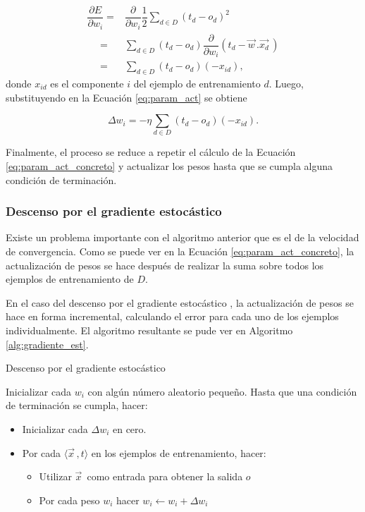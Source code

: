 \documentclass[spanish]{report}
\begin{document}
\begin{equation}
  \begin{array}{ll}
\dfrac{\partial E}{\partial w_i} = & \dfrac{\partial}{\partial w_i} \dfrac{1}{2}\sum_{d \in D}{}{(t_d - o_d)^2} \\
~~~~~~= & \sum_{d \in D}{}{(t_d - o_d)}\dfrac{\partial}{\partial w_i}(t_d - \vec{w}^{\,}.\vec{x_d}^{\,})	 \\
~~~~~~= & \sum_{d \in D}{}{(t_d - o_d)}(-x_{id}),
  \end{array}
\end{equation}
\newline
\noindent donde $x_{id}$ es el componente $i$ del ejemplo de entrenamiento $d$. Luego, substituyendo en la Ecuación \ref{eq:param_act} se obtiene

\begin{equation}\label{eq:param_act_concreto}
\Delta w_i = - \eta \sum_{d \in D}{}{(t_d - o_d)}(-x_{id}).
\end{equation}

Finalmente, el proceso se reduce a repetir el cálculo de la Ecuación \ref{eq:param_act_concreto} y actualizar los pesos hasta que se cumpla alguna condición de terminación. 

\subsubsection{Descenso por el gradiente estocástico}

Existe un problema importante con el algoritmo anterior que es el de la velocidad de convergencia. Como se puede ver en la Ecuación \ref{eq:param_act_concreto}, la actualización de pesos se hace después de realizar la suma sobre todos los ejemplos de entrenamiento de $D$.

En el caso del descenso por el gradiente estocástico \cite{Mitchell97a}, la actualización de pesos se hace en forma incremental, calculando el error para cada uno de los ejemplos individualmente. El algoritmo resultante se pude ver en Algoritmo \ref{alg:gradiente_est}.

\begin{algorithm}
\caption{Descenso por el gradiente estocástico}
\begin{algorithmic}[1]
	\label{alg:gradiente_est}
  \STATE Inicializar cada $w_i$ con algún número aleatorio pequeño.
  \STATE Hasta que una condición de terminación se cumpla, hacer:
  \begin{itemize}
	\itemsep0em 
  	\item Inicializar cada $\Delta w_i$ en cero.
  	\item Por cada $\langle \vec{x}^{\,}, t \rangle$ en los ejemplos de entrenamiento, hacer:
  	\begin{itemize}
		\itemsep0em 
  		\item Utilizar $\vec{x}^{\,}$ como entrada para obtener la salida $o$
  		\item Por cada peso $w_i$ hacer $w_i \leftarrow w_i+ \Delta w_i$
  	\end{itemize}
  \end{itemize}
\end{algorithmic}
\end{algorithm}
\end{document}
